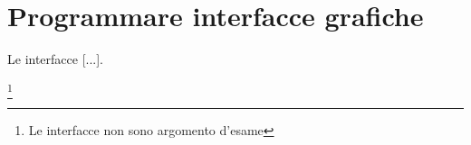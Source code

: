 \chapter{Programmare interfacce grafiche}

Le interfacce [...].

\footnote{Le interfacce non sono argomento d'esame}